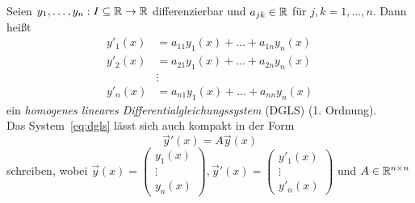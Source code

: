 \begin{definition}
    Seien $y_1,\dots,y_n: I \subseteq \mathbb{R} \to \mathbb{R}$ differenzierbar und $a_{jk} \in \mathbb{R}$ für $j,k = 1,\dots,n$.
    Dann heißt
    \begin{equation}\tag{DGLS}\label{eq:dgls}
        \begin{aligned}
            y'_1(x) &= a_{11} y_1(x) + \dots + a_{1n} y_n(x)\\
            y'_2(x) &= a_{21} y_1(x) + \dots + a_{2n} y_n(x)\\
            &\vdots\\
            y'_n(x) &= a_{n1} y_1(x) + \dots + a_{nn} y_n(x)
        \end{aligned}
    \end{equation}
    ein \emph{homogenes lineares Differentialgleichungssystem} (DGLS) (1. Ordnung).\\
    Das System~\eqref{eq:dgls} lässt sich auch kompakt in der Form
    \begin{equation*}
        \vec{y}'(x) = A \vec{y}(x)
    \end{equation*}
    schreiben, wobei $\vec{y}(x) = \begin{pmatrix} y_1(x)\\ \vdots\\ y_n(x) \end{pmatrix}, \vec{y}'(x) = \begin{pmatrix} y'_1(x)\\ \vdots\\ y'_n(x) \end{pmatrix}$
    und $A \in \mathbb{R}^{n \times n}$
\end{definition}